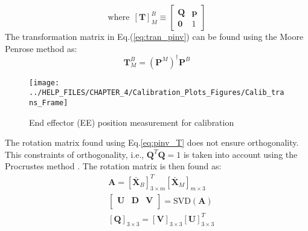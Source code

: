 \begin{equation}
\text{where}~~[\textbf{T}]_{M}^B 
 \equiv 
\left[ \begin{array}{c|c}
\mathbf{Q}&\mathbf{p}\\ \hline
\mathbf{0}& 1 
\end{array} \right]
\label{eq:TDH}
\end{equation}
The transformation matrix in Eq.(\ref{eq:tran_pinv}) can be found using the Moore Penrose method as:
\begin{equation}
\label{eq:pinv_T}
\mathbf{T}_{M}^{B} = (\textbf{P}^M)^\dag \textbf{P}^B
\end{equation}
\begin{figure}[!b]
\centering
\texttt{[image: ../HELP\_FILES/CHAPTER\_4/Calibration\_Plots\_Figures/Calib\_trans\_Frame]}
\caption{End effector (EE) position measurement for calibration}
\label{fig:Calib_trans_Frame}
\end{figure}
The rotation matrix found using Eq.\eqref{eq:pinv_T} does not ensure orthogonality. This constraints of orthogonality, i.e., $\mathbf{Q}^T\mathbf{Q}=1$ is taken into account using the Procrustes method 
\citep{gower2004procrustes}. The rotation matrix is then found as:
\begin{eqnarray}
 ~& \mathbf{A}=[{{\bar{\mathbf{X}}}_{B}}]_{3\times m}^{T}{{[{{\bar{\mathbf{X}}}_{M}}]}_{m\times 3}} \\ 
 ~& \left[ \begin{matrix}
   \mathbf{U} & \mathbf{D} & \mathbf{V}  \\
\end{matrix} \right]=\text{SVD}(\mathbf{A}) \\ 
 ~& {{[\mathbf{Q}]}_{3\times 3}}=\left[ \mathbf{V} \right]_{3\times 3}{{\left[ \mathbf{U} \right]}^{T}_{3\times 3}} 
\end{eqnarray}



